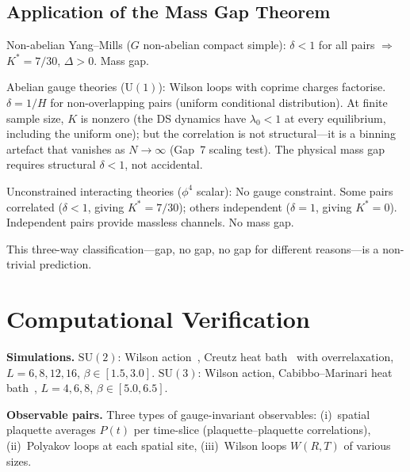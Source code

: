 \documentclass[11pt,a4paper]{article}
\theoremstyle{definition}
\theoremstyle{remark}
\newcommand{\SU}{\mathrm{SU}}
\begin{document}
\subsection{Application of the Mass Gap Theorem}

Non-abelian Yang--Mills ($G$ non-abelian compact simple): $\delta<1$ for all pairs $\Rightarrow$ $K^*=7/30$, $\Delta>0$. Mass gap.

Abelian gauge theories ($\mathrm{U}(1)$): Wilson loops with coprime charges factorise. $\delta=1/H$ for non-overlapping pairs (uniform conditional distribution). At finite sample size, $K$ is nonzero (the DS dynamics have $\lambda_0<1$ at every equilibrium, including the uniform one); but the correlation is not structural---it is a binning artefact that vanishes as $N\to\infty$ (Gap~7 scaling test). The physical mass gap requires structural $\delta<1$, not accidental.

Unconstrained interacting theories ($\phi^4$ scalar): No gauge constraint. Some pairs correlated ($\delta<1$, giving $K^*=7/30$); others independent ($\delta=1$, giving $K^*=0$). Independent pairs provide massless channels. No mass gap.

This three-way classification---gap, no gap, no gap for different reasons---is a non-trivial prediction.


\section{Computational Verification}\label{sec:computation}

\textbf{Simulations.} $\SU(2)$: Wilson action~\cite{Wilson1974,Makeenko2002}, Creutz heat bath~\cite{Creutz1983} with overrelaxation, $L=6,8,12,16$, $\beta\in[1.5,3.0]$. $\SU(3)$: Wilson action, Cabibbo--Marinari heat bath~\cite{CabibboMarinari}, $L=4,6,8$, $\beta\in[5.0,6.5]$.

\textbf{Observable pairs.} Three types of gauge-invariant observables: (i)~spatial plaquette averages $P(t)$ per time-slice (plaquette--plaquette correlations), (ii)~Polyakov loops at each spatial site, (iii)~Wilson loops $W(R,T)$ of various sizes.
\end{document}
